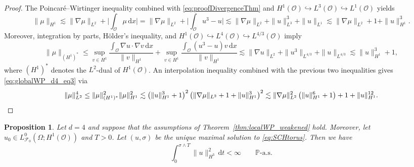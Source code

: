 \documentclass[reqno]{amsart}
\newtheorem{proposition}[Satz]{Proposition}
\newcommand{\F}{\mathscr{F}}
\newcommand{\sO}{\mathscr{O}}
\newcommand{\hra}{\hookrightarrow}
\newcommand{\1}{\mathbf{1}}
\newcommand{\dt}{\,\mathrm{d}t}
\newcommand{\dx}{\,\mathrm{d}x}
\begin{document}
\begin{proof}
The Poincaré--Wirtinger inequality 
combined with \eqref{eq:proofDivergenceThm} and $H^1(\sO) \hra L^3(\sO)\hra L^1(\sO)$ yields
\begin{equation*}
    \|\mu\|_{H^1}  \lesssim \|\nabla\mu\|_{L^2} + \Big| \int_{\sO }\mu \dx \Big|
    = \|\nabla\mu\|_{L^2}+\Big|\int_{\sO }u^3 - u\Big| \lesssim \|\nabla\mu\|_{L^2} +\|u\|_{L^3}^3+\|u\|_{L^1}
    \lesssim \|\nabla\mu\|_{L^2} +1+\|u\|_{H^1}^{3}.
\end{equation*}
Moreover, integration by parts, Hölder's inequality, and  $H^1(\sO) \hookrightarrow L^4(\sO) \hra L^{4/3}(\sO)$ imply
\begin{equation*}
    \|\mu\|_{(H^1)^*} \le  \sup_{v\in H^1} \frac{\int_{\sO} \nabla u \cdot \nabla v\dx }{\|v\|_{H^1}} + \sup_{v\in H^1} \frac{\int_{\sO}(u^3-u)v\dx }{\|v\|_{H^1}}
    \lesssim \|\nabla u\|_{L^2} + \|u^3\|_{L^{4/3}} + \|u\|_{L^{4/3}}
    \lesssim \|u\|_{H^1}^3 + 1,
\end{equation*}
where $(H^1)^*$ denotes the $L^2$-dual of $H^1(\sO)$. An interpolation inequality combined with the previous two inequalities gives \eqref{eq:globalWP_d4_eq3} via
\begin{equation*}
    \|\mu\|_{L^2}^4
    \leq \|\mu\|^2_{(H^1)^*}\|\mu\|^2_{H^1}
    \lesssim \left( \|u\|_{H^1}^3 + 1 \right)^2 \left( \|\nabla\mu\|_{L^2} + 1 + \|u\|_{H^1}^{3} \right)^2
    \lesssim \|\nabla\mu\|_{L^2}^2 \left(\|u\|_{H^1}^6+1\right)+1+\|u\|_{H^1}^{12}. \qedhere
\end{equation*}
\end{proof}

\begin{proposition} \label{prop:global_well_posedness_dim_4-part2}
	Let $d=4$ and suppose that the assumptions of Theorem~\ref{thm:localWP_weakened} hold. Moreover, let $u_0\in L^0_{\F_0}(\Omega;H^1(\sO))$ and $T>0$. Let $(u,\sigma)$ be the unique maximal solution to \eqref{eq:SCHtorus}. Then we have
	\begin{equation}\label{eq:thm-global_well_posedness_dim_4-claim1}
	  \int_0^{\sigma\wedge T} \|u\|^2_{H^3} \dt < \infty  \qquad \mathbb{P}\text{-a.s.}
	\end{equation}
\end{proposition}
\end{document}
